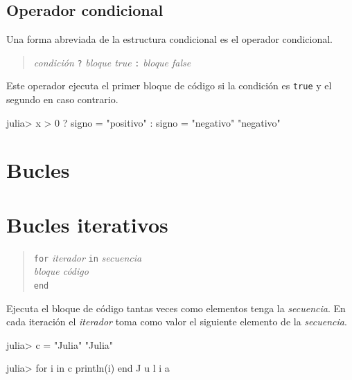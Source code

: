 \documentclass[
  letterpaper,
  DIV=11,
  numbers=noendperiod]{scrreprt}
\newenvironment{Shaded}{\begin{snugshade}}{\end{snugshade}}
\newcommand{\ControlFlowTok}[1]{\textcolor[rgb]{0.00,0.23,0.31}{#1}}
\newcommand{\FloatTok}[1]{\textcolor[rgb]{0.68,0.00,0.00}{#1}}
\newcommand{\FunctionTok}[1]{\textcolor[rgb]{0.28,0.35,0.67}{#1}}
\newcommand{\KeywordTok}[1]{\textcolor[rgb]{0.00,0.23,0.31}{#1}}
\newcommand{\NormalTok}[1]{\textcolor[rgb]{0.00,0.23,0.31}{#1}}
\newcommand{\OperatorTok}[1]{\textcolor[rgb]{0.37,0.37,0.37}{#1}}
\newcommand{\StringTok}[1]{\textcolor[rgb]{0.13,0.47,0.30}{#1}}
\begin{document}
\hypertarget{operador-condicional}{%
\subsection{Operador condicional}\label{operador-condicional}}

Una forma abreviada de la estructura condicional es el operador
condicional.

\begin{quote}
\emph{condición} \texttt{?} \emph{bloque true} \texttt{:} \emph{bloque
false}
\end{quote}

Este operador ejecuta el primer bloque de código si la condición es
\texttt{true} y el segundo en caso contrario.

\begin{Shaded}
\begin{Highlighting}[]
\NormalTok{julia}\OperatorTok{\textgreater{}}\NormalTok{ x }\OperatorTok{\textgreater{}} \FloatTok{0}\NormalTok{ ? signo }\OperatorTok{=} \StringTok{"positivo"} \OperatorTok{:}\NormalTok{ signo }\OperatorTok{=} \StringTok{"negativo"}
\StringTok{"negativo"}
\end{Highlighting}
\end{Shaded}

\hypertarget{bucles}{%
\section{Bucles}\label{bucles}}

\hypertarget{bucles-iterativos}{%
\section{Bucles iterativos}\label{bucles-iterativos}}

\begin{quote}
\texttt{for} \emph{iterador} \texttt{in} \emph{secuencia}\\
\hspace*{0.333em}\hspace*{0.333em}\hspace*{0.333em}\emph{bloque
código}\\
\texttt{end}
\end{quote}

Ejecuta el bloque de código tantas veces como elementos tenga la
\emph{secuencia}. En cada iteración el \emph{iterador} toma como valor
el siguiente elemento de la \emph{secuencia}.

\begin{Shaded}
\begin{Highlighting}[]
\NormalTok{julia}\OperatorTok{\textgreater{}}\NormalTok{ c }\OperatorTok{=} \StringTok{"Julia"}
\StringTok{"Julia"}

\NormalTok{julia}\OperatorTok{\textgreater{}} \ControlFlowTok{for}\NormalTok{ i }\KeywordTok{in}\NormalTok{ c}
         \FunctionTok{println}\NormalTok{(i)}
       \ControlFlowTok{end}
\NormalTok{J}
\NormalTok{u}
\NormalTok{l}
\NormalTok{i}
\NormalTok{a}
\end{Highlighting}
\end{Shaded}
\end{document}
